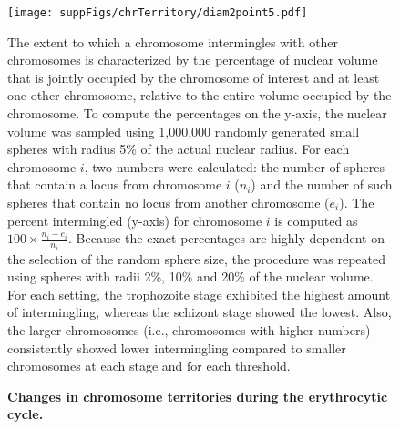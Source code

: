 \documentclass{article}
\begin{document}
\begin{figure}
  \begin{center}
  \texttt{[image: suppFigs/chrTerritory/diam2point5.pdf]}
   \end{center}
\caption{{\bf Changes in chromosome territories during the erythrocytic cycle.}}
{ The extent to which a chromosome intermingles with other chromosomes is
    characterized by the percentage of nuclear volume that is jointly occupied
    by the chromosome of interest and at least one other chromosome,
    relative to the entire volume occupied by the chromosome.
    To compute the percentages on the y-axis, the nuclear volume was sampled using
    1,000,000 randomly generated small spheres with radius 5\% of the actual nuclear
    radius. For each chromosome $i$, two numbers were calculated: the number of spheres that contain a locus
    from chromosome $i$ ($n_i$) and the number of such spheres that
    contain no locus from another chromosome ($e_i$). The percent intermingled (y-axis)
    for chromosome $i$ is computed as $100\times \frac{n_i-e_i}{n_i}$.
    Because the exact percentages are highly dependent on the selection of the random
    sphere size, the procedure was repeated using spheres with
    radii 2\%, 10\% and 20\% of the nuclear volume.  For each setting,
    the trophozoite stage exhibited the highest amount of intermingling,
    whereas the schizont stage showed the lowest. Also, the
    larger chromosomes (i.e., chromosomes with higher numbers)
    consistently showed lower intermingling compared to smaller
    chromosomes at each stage and for each threshold.}
\label{suppfig:territory}
\end{figure}
\clearpage
\end{document}
